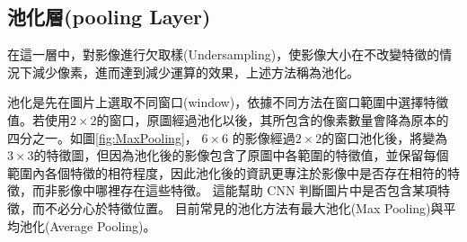 \subsection{池化層(pooling Layer)}
在這一層中，對影像進行欠取樣(Undersampling)，使影像大小在不改變特徵的情況下減少像素，進而達到減少運算的效果，上述方法稱為池化。

池化是先在圖片上選取不同窗口(window)，依據不同方法在窗口範圍中選擇特徵值。若使用\(2 \times 2\)的窗口，原圖經過池化以後，其所包含的像素數量會降為原本的四分之一。如圖\ref{fig:MaxPooling}， \(6 \times6\) 的影像經過\(2 \times 2\)的窗口池化後，將變為\(3 \times 3\)的特徵圖，但因為池化後的影像包含了原圖中各範圍的特徵值，並保留每個範圍內各個特徵的相符程度，因此池化後的資訊更專注於影像中是否存在相符的特徵，而非影像中哪裡存在這些特徵。
這能幫助 CNN 判斷圖片中是否包含某項特徵，而不必分心於特徵位置。
目前常見的池化方法有最大池化(Max Pooling)與平均池化(Average Pooling)。

